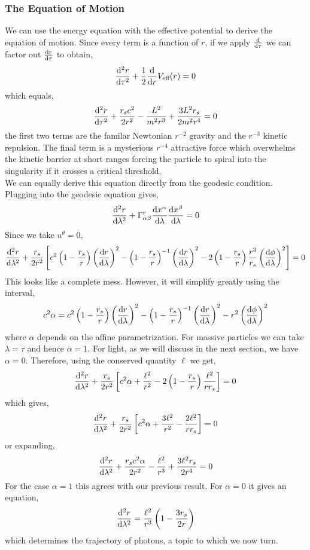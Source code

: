 \documentclass[11pt, a4paper]{article}
\begin{document}
\subsubsection{The Equation of Motion}

We can use the energy equation with the effective potential to derive the equation of motion. Since every term is a function of $r$, if we apply $\frac{\mathrm{d}}{\mathrm{d}\tau}$ we can factor out $\frac{\mathrm{d}r}{\mathrm{d}\tau}$ to obtain,
\[ \frac{\mathrm{d}^{2} r}{\mathrm{d}\tau^{2}} + \frac{1}{2} \frac{\mathrm{d}}{\mathrm{d}r} V_{\text{eff}}(r) = 0 \]
which equals,
\[ \frac{\mathrm{d}^{2} r}{\mathrm{d}\tau^{2}} + \frac{r_s c^2}{2 r^2} - \frac{L^2}{m^2 r^3} +  \frac{3L^2 r_s}{2 m^2 r^4} = 0 \]
the first two terms are the familar Newtonian $r^{-2}$ gravity and the $r^{-3}$ kinetic repulsion. The final term is a mysterious $r^{-4}$ attractive force which overwhelms the kinetic barrier at short ranges forcing the particle to spiral into the singularity if it crosses a critical threshold.
\bigskip\\
We can equally derive this equation directly from the geodesic condition. Plugging into the geodesic equation gives,
\[ \frac{\mathrm{d}^{2} r}{\mathrm{d}\lambda^{2}} + \Gamma^r_{\alpha \beta} \frac{\mathrm{d}x^\alpha}{\mathrm{d}\lambda} \frac{\mathrm{d}x^\beta}{\mathrm{d}\lambda} = 0 \]
Since we take $u^\theta = 0$,
\[ \frac{\mathrm{d}^{2} r}{\mathrm{d}\lambda^{2}} + \frac{r_s}{2 r^2} \left[  c^2 \left(1 - \frac{r_s}{r} \right) \left( \frac{\mathrm{d}r}{\mathrm{d}\lambda} \right)^2 - \left(1 - \frac{r_s}{r} \right)^{-1} \left( \frac{\mathrm{d}r}{\mathrm{d}\lambda} \right)^2 - 2 \left(1 - \frac{r_s}{r} \right) \frac{r^3}{r_s} \left( \frac{\mathrm{d}\phi}{\mathrm{d}\lambda} \right)^2 \right] = 0 \]
This looks like a complete mess. However, it will simplify greatly using the interval,
\[ c^2 \alpha = c^2 \left(1 - \frac{r_s}{r} \right) \left( \frac{\mathrm{d}r}{\mathrm{d}\lambda} \right)^2 - \left(1 - \frac{r_s}{r} \right)^{-1} \left( \frac{\mathrm{d}r}{\mathrm{d}\lambda} \right)^2 - r^2 \left( \frac{\mathrm{d}\phi}{\mathrm{d}\lambda} \right)^2 \]
where $\alpha$ depends on the affine parametrization. For massive particles we can take $\lambda = \tau$ and hence $\alpha = 1$. For light, as we will discuss in the next section, we have $\alpha = 0$. Therefore, using the conserved quantity $\ell$ we get,
\[ \frac{\mathrm{d}^{2} r}{\mathrm{d}\lambda^{2}} + \frac{r_s}{2 r^2} \left[ c^2 \alpha + \frac{\ell^2}{r^2} - 2 \left(1 - \frac{r_s}{r} \right) \frac{\ell^2}{r r_s} \right] = 0 \]
which gives,
\[ \frac{\mathrm{d}^{2} r}{\mathrm{d}\lambda^{2}} + \frac{r_s}{2 r^2} \left[ c^2 \alpha + \frac{3\ell^2}{r^2} -  \frac{2 \ell^2}{r r_s} \right] = 0 \]
or expanding,
\[ \frac{\mathrm{d}^{2} r}{\mathrm{d}\lambda^{2}} + \frac{r_s c^2 \alpha}{2 r^2} - \frac{\ell^2}{r^3} + \frac{3 \ell^2 r_s}{2 r^4} = 0   \]
For the case $\alpha = 1$ this agrees with our previous result. For $\alpha = 0$ it gives an equation,
\[ \frac{\mathrm{d}^{2} r}{\mathrm{d}\lambda^{2}} = \frac{\ell^2}{r^3} \left( 1 - \frac{3 r_s}{2 r} \right) \]
which determines the trajectory of photons, a topic to which we now turn.
\end{document}
